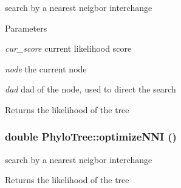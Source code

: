 \label{classPhyloTree_abd42e1cc3b3da9e0d00ea00182a031d2}
search by a nearest neigbor interchange 
\begin{DoxyParams}{Parameters}
\item[{\em cur\_\-score}]current likelihood score \item[{\em node}]the current node \item[{\em dad}]dad of the node, used to direct the search \end{DoxyParams}
\begin{DoxyReturn}{Returns}
the likelihood of the tree 
\end{DoxyReturn}
\hypertarget{classPhyloTree_a8927dbf75a06ea797cc76b619759985d}{
\subsubsection[{optimizeNNI}]{\setlength{\rightskip}{0pt plus 5cm}double PhyloTree::optimizeNNI ()}}
\label{classPhyloTree_a8927dbf75a06ea797cc76b619759985d}
search by a nearest neigbor interchange \begin{DoxyReturn}{Returns}
the likelihood of the tree 
\end{DoxyReturn}


